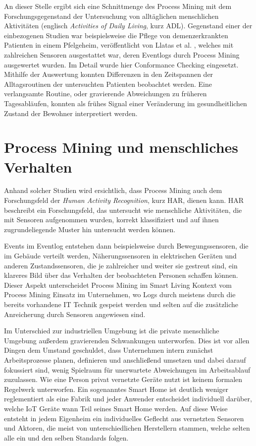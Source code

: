 An dieser Stelle ergibt sich eine Schnittmenge des Process Mining mit dem Forschungsgegenstand der Untersuchung von alltäglichen menschlichen Aktivitäten (englisch \textit{Activities of Daily Living}, kurz ADL). 
Gegenstand einer der einbezogenen Studien war beispielsweise die Pflege von demenzerkrankten Patienten in einem Pfelgeheim, veröffentlicht von Llatas et al. \cite{llatas}, welches mit zahlreichen Sensoren ausgestattet war, deren Eventlogs durch Process Mining ausgewertet wurden. Im Detail wurde hier Conformance Checking eingesetzt. Mithilfe der Auswertung konnten  Differenzen in den Zeitspannen der Alltagsroutinen der untersuchten Patienten beobachtet werden. Eine verlangsamte Routine, oder gravierende Abweichungen zu früheren Tagesabläufen, konnten als frühes Signal einer Veränderung im gesundheitlichen Zustand der Bewohner interpretiert werden.

\section{Process Mining und menschliches Verhalten}\label{har}
Anhand solcher Studien wird ersichtlich, dass Process Mining auch dem Forschungsfeld der \textit{Human Activity Recognition}, kurz HAR, dienen kann. HAR beschreibt ein Forschungsfeld, das untersucht wie menschliche Aktivitäten, die mit Sensoren aufgenommen wurden, korrekt klassifiziert und auf ihnen zugrundeliegende Muster hin untersucht werden können. 

Events im Eventlog entstehen dann beispielsweise durch Bewegungssensoren, die im Gebäude verteilt werden, Näherungssensoren in elektrischen Geräten und anderen Zustandssensoren, die je zahlreicher und weiter sie gestreut sind, ein klareres Bild über das Verhalten der beobachteten Personen schaffen können. 
Dieser Aspekt unterscheidet Process Mining im Smart Living Kontext vom Process Mining Einsatz im Unternehmen, wo Logs durch meistens durch die bereits vorhandene IT Technik gespeist werden und selten auf die zusätzliche Anreicherung durch Sensoren angewiesen sind.
 
Im Unterschied zur industriellen Umgebung ist die private menschliche Umgebung außerdem gravierenden Schwankungen unterworfen. Dies ist vor allen Dingen dem Umstand geschuldet, dass Unternehmen intern zunächst Arbeitsprozesse planen, definieren und anschließend umsetzen und dabei darauf fokussiert sind, wenig Spielraum für unerwartete Abweichungen im Arbeitsablauf zuzulassen. 
Wie eine Person privat vernetzte Geräte nutzt ist keinem formalen Regelwerk unterworfen. Ein sogenanntes Smart Home ist deutlich weniger reglementiert als eine Fabrik und jeder Anwender entscheidet individuell darüber, welche IoT Geräte wann Teil seines Smart Home werden. Auf diese Weise entsteht in jedem Eigenheim ein individuelles Geflecht aus vernetzten Sensoren und Aktoren, die meist von unterschiedlichen Herstellern stammen, welche selten alle ein und den selben Standards folgen.

